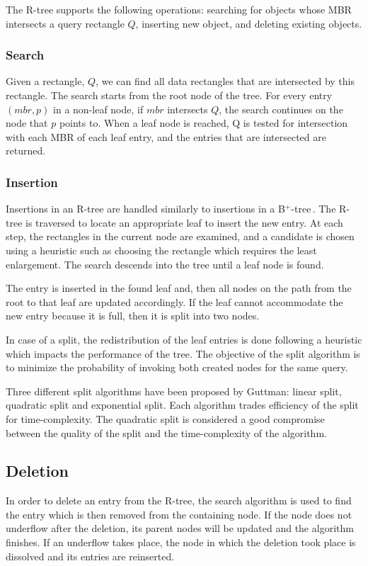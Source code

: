 \documentclass[11pt, a4paper, oneside]{article}
\newcommand{\bplus}{B$^+$-tree$\,$}
\begin{document}
The R-tree supports the following operations: searching for objects whose MBR intersects a query rectangle $Q$, inserting new object, and deleting existing objects.

\subsubsection*{Search}
Given a rectangle, $Q$, we can find all data rectangles that are intersected by this rectangle. The search starts from the root node of the tree. For every entry $(mbr, p)$ in a non-leaf node, if $mbr$ intersects $Q$, the search continues on the node that $p$ points to. When a leaf node is reached, Q is tested for intersection with each MBR of each leaf entry, and the entries that are intersected are returned.

\subsubsection*{Insertion}
Insertions in an R-tree are handled similarly to insertions in a \bplus. The R-tree is traversed to locate an appropriate leaf to insert the new entry. At each step, the rectangles in the current node are examined, and a candidate is chosen using a heuristic such as choosing the rectangle which requires the least enlargement. The search descends into the tree until a leaf node is found.

The entry is inserted in the found leaf and, then all nodes on the path from the root to that leaf are updated accordingly. If the leaf cannot accommodate the new entry because it is full, then it is split into two nodes.

In case of a split, the redistribution of the leaf entries is done following a heuristic which impacts the performance of the tree. The objective of the split algorithm is to minimize the probability of invoking both created nodes for the same query. 

Three different split algorithms have been proposed by Guttman: linear split, quadratic split and exponential split. Each algorithm trades efficiency of the split for time-complexity. The quadratic split is considered a good compromise between the quality of the split and the time-complexity of the algorithm.

\subsection*{Deletion}
In order to delete an entry from the R-tree, the search algorithm is used to find the entry which is then removed from the containing node. If the node does not underflow after the deletion, its parent nodes will be updated and the algorithm finishes. If an underflow takes place, the node in which the deletion took place is dissolved and its entries are reinserted.
\end{document}
